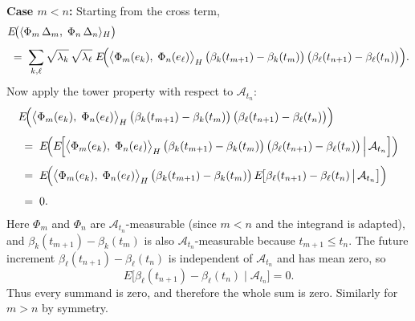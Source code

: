 \documentclass[11pt]{article}
\theoremstyle{definition}
\theoremstyle{remark}
\begin{document}

\noindent\textbf{Case $m < n$:} Starting from the cross term,
\begin{align*}
    &E\!\bigl(\langle \Phi_m\,\Delta_m,\;\Phi_n\,\Delta_n\rangle_H\bigr) \\[4pt]
    &\;=\;
    \sum_{k,\ell}\sqrt{\lambda_k}\,\sqrt{\lambda_\ell}\;
    E\!\Bigl(
        \bigl\langle \Phi_m(e_k),\;\Phi_n(e_\ell)\bigr\rangle_H\,
        \bigl(\beta_k(t_{m+1})-\beta_k(t_m)\bigr)\,
        \bigl(\beta_\ell(t_{n+1})-\beta_\ell(t_n)\bigr)
    \Bigr).
\end{align*}
Now apply the tower property with respect to $\mathcal{A}_{t_n}$:
\begin{align*}
    &E\!\Bigl(
        \bigl\langle \Phi_m(e_k),\;\Phi_n(e_\ell)\bigr\rangle_H\,
        \bigl(\beta_k(t_{m+1})-\beta_k(t_m)\bigr)\,
        \bigl(\beta_\ell(t_{n+1})-\beta_\ell(t_n)\bigr)
    \Bigr) \\[4pt]
    &\;=\;
    E\!\Bigl(
        E\!\Bigl[
            \bigl\langle \Phi_m(e_k),\;\Phi_n(e_\ell)\bigr\rangle_H\,
            \bigl(\beta_k(t_{m+1})-\beta_k(t_m)\bigr)\,
            \bigl(\beta_\ell(t_{n+1})-\beta_\ell(t_n)\bigr)
            \,\Big|\, \mathcal{A}_{t_n}
        \Bigr]
    \Bigr) \\[4pt]
    &\;=\;
    E\!\Bigl(
        \bigl\langle \Phi_m(e_k),\;\Phi_n(e_\ell)\bigr\rangle_H\,
        \bigl(\beta_k(t_{m+1})-\beta_k(t_m)\bigr)\,
        E\!\bigl[
            \beta_\ell(t_{n+1})-\beta_\ell(t_n)
            \,\big|\, \mathcal{A}_{t_n}
        \bigr]
    \Bigr) \\[4pt]
    &\;=\; 0.
\end{align*}
Here $\Phi_m$ and $\Phi_n$ are $\mathcal{A}_{t_n}$-measurable (since $m<n$ and the integrand is adapted), and $\beta_k(t_{m+1})-\beta_k(t_m)$ is also $\mathcal{A}_{t_n}$-measurable because $t_{m+1}\le t_n$. The future increment $\beta_\ell(t_{n+1})-\beta_\ell(t_n)$ is independent of $\mathcal{A}_{t_n}$ and has mean zero, so
\[
E\!\bigl[\beta_\ell(t_{n+1})-\beta_\ell(t_n)\mid \mathcal{A}_{t_n}\bigr]=0.
\]
Thus every summand is zero, and therefore the whole sum is zero. Similarly for $m > n$ by symmetry.
\end{document}
